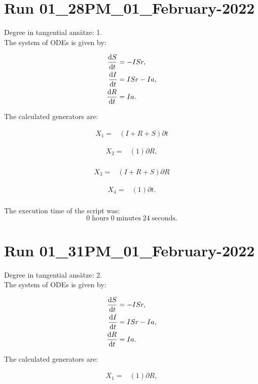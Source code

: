 \section*{Run 01\_28PM\_01\_February-2022}
Degree in tangential ansätze:	1.\\
The system of ODEs is given by:

\begin{align*}
\dv{S}{t}&=- I S r,\\
\dv{I}{t}&=I S r - I a,\\
\dv{R}{t}&=I a.\\
\end{align*}

\noindent The calculated generators are:

\begin{align*}
X_{1}=&\left(I+R+S \right)\partial t
\end{align*}

\begin{align*}
X_{2}=&\left(1 \right)\partial R,\\
\end{align*}

\begin{align*}
X_{3}=&\left(I+R+S \right)\partial R
\end{align*}

\begin{align*}
X_{4}=&\left(1 \right)\partial t.\\
\end{align*}

\noindent The execution time of the script was:
$$0\;\mathrm{hours}\;0\;\mathrm{minutes}\;24 \;\mathrm{seconds}.$$
\section*{Run 01\_31PM\_01\_February-2022}
Degree in tangential ansätze:	2.\\
The system of ODEs is given by:

\begin{align*}
\dv{S}{t}&=- I S r,\\
\dv{I}{t}&=I S r - I a,\\
\dv{R}{t}&=I a.\\
\end{align*}

\noindent The calculated generators are:

\begin{align*}
X_{1}=&\left(1 \right)\partial R,\\
\end{align*}

